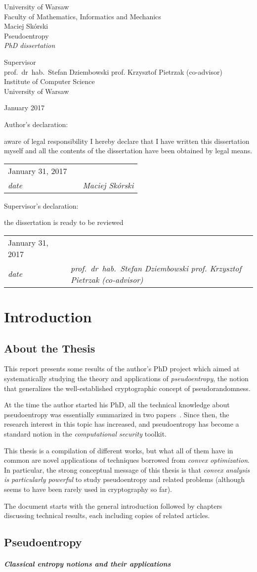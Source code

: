 \documentclass[12pt]{report}
\author{\theauthor}
\title{\thetitle}
\def\thetitle{%
Pseudoentropy}
\def\theauthor{%
Maciej Sk\'{o}rski}
\def\theday{%
31}
\def\themonth{%
January}
\def\theyear{%
2017}
\def\thesupervisor{%
prof.~dr~hab.~Stefan Dziembowski \newline
prof. Krzysztof Pietrzak (co-advisor)
}
\def\thedate{\themonth{} \theday, \theyear}
\def\themonthyear{\themonth{} \theyear}
\def\titlepages{\newpage
\thispagestyle{empty}
\begin{centering}
\Large
University of Warsaw\\
\large
Faculty of Mathematics, Informatics and Mechanics\\
\vspace{4cm}
\theauthor\\
\vspace{0.85cm}
\LARGE
\thetitle\\
\vspace{0.3cm}
\normalsize
\textit{PhD dissertation}\\
\vspace{6.35cm}
\begin{flushright}
Supervisor\\
\vspace{0.25cm}
\thesupervisor\\
\vspace{0.75cm}
Institute of Computer Science\\
University of Warsaw\\
\end{flushright}
\vfill
\themonthyear\\
\end{centering}
\newpage\thispagestyle{empty}
\hfill \par
\vfill
\noindent
Author's declaration:\par\noindent
aware of legal responsibility I hereby declare that I have written this dissertation
myself and all the contents of the dissertation have been obtained by legal means.
\par
\vspace{0.35cm}
\hfill \par
\noindent
\begin{tabular}[t]{p{0.3\textwidth}p{0.2\textwidth}p{0.4\textwidth}}
\thedate&&\dotfill\\
\hfill\scriptsize \textit{date} \hfill \phantom{.} &&
\hfill\scriptsize \textit{\theauthor} \hfill \phantom{.}
\end{tabular}\par
\vspace{1.8cm}
\hfill \par
\noindent
Supervisor's declaration:
\par\noindent
the dissertation is ready to be reviewed
\par
\vspace{0.35cm}
\hfill \par
\noindent
\begin{tabular}[t]{p{0.3\textwidth}p{0.2\textwidth}p{0.4\textwidth}}
\thedate&&\dotfill\\
\hfill\scriptsize \textit{date} \hfill \phantom{.} &&
\hfill\scriptsize \textit{\thesupervisor} \hfill \phantom{.}
\end{tabular}
\newpage
}
\begin{document}
\titlepages

\tableofcontents

\chapter{Introduction}

\section{About the Thesis}
This report presents some results of the author's PhD project which aimed at   systematically studying the theory and applications of \emph{pseudoentropy}, the notion that 
generalizes the well-established cryptographic concept of pseudorandomness. 

At the time the author started his PhD, 
all the technical knowledge about pseudoentropy was essentially summarized in two papers~\cite{fullercomputational, DBLP:conf/random/BarakSW03}. 
Since then, the research interest in this topic has increased,
and pseudoentropy has become a standard notion in the \emph{computational security} toolkit.


This thesis is a compilation of different works, but what all of them have in common are novel applications of techniques borrowed from
\emph{convex optimization}. In particular, the strong conceptual message of this thesis is that \emph{convex analysis is  particularly powerful} to study pseudoentropy and related problems (although seems to have been rarely used in cryptography so far).


The document starts with the general introduction followed by chapters discussing technical results, each including copies of related articles.




\section{Pseudoentropy}


\paragraph{Classical entropy notions and their applications}
\end{document}
